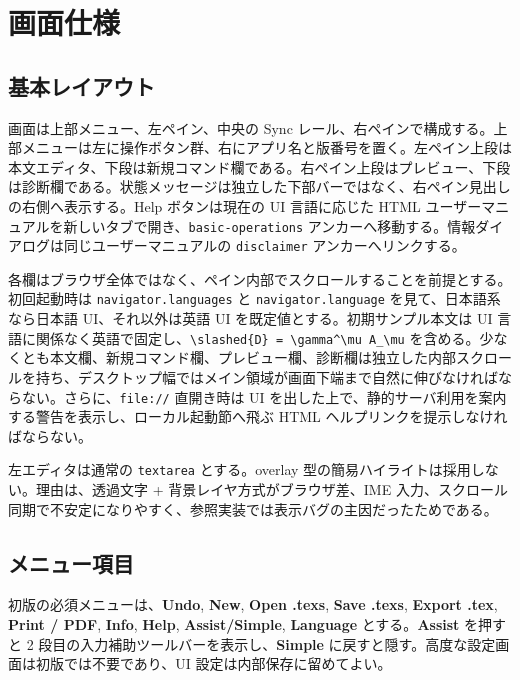 \documentclass[11pt,a4paper]{ltjsarticle}
\newcommand{\code}[1]{\texttt{#1}}
\newcommand{\term}[1]{\textsf{\textbf{#1}}}
\begin{document}
\section{画面仕様}

\subsection{基本レイアウト}

画面は上部メニュー、左ペイン、中央の Sync レール、右ペインで構成する。上部メニューは左に操作ボタン群、右にアプリ名と版番号を置く。左ペイン上段は本文エディタ、下段は新規コマンド欄である。右ペイン上段はプレビュー、下段は診断欄である。状態メッセージは独立した下部バーではなく、右ペイン見出しの右側へ表示する。Help ボタンは現在の UI 言語に応じた HTML ユーザーマニュアルを新しいタブで開き、\code{basic-operations} アンカーへ移動する。情報ダイアログは同じユーザーマニュアルの \code{disclaimer} アンカーへリンクする。

各欄はブラウザ全体ではなく、ペイン内部でスクロールすることを前提とする。初回起動時は \code{navigator.languages} と \code{navigator.language} を見て、日本語系なら日本語 UI、それ以外は英語 UI を既定値とする。初期サンプル本文は UI 言語に関係なく英語で固定し、\verb|\slashed{D} = \gamma^\mu A_\mu| を含める。少なくとも本文欄、新規コマンド欄、プレビュー欄、診断欄は独立した内部スクロールを持ち、デスクトップ幅ではメイン領域が画面下端まで自然に伸びなければならない。さらに、\code{file://} 直開き時は UI を出した上で、静的サーバ利用を案内する警告を表示し、ローカル起動節へ飛ぶ HTML ヘルプリンクを提示しなければならない。

\begin{decisionbox}[現行版のエディタ方針]
左エディタは通常の \code{textarea} とする。overlay 型の簡易ハイライトは採用しない。理由は、透過文字 + 背景レイヤ方式がブラウザ差、IME 入力、スクロール同期で不安定になりやすく、参照実装では表示バグの主因だったためである。
\end{decisionbox}

\subsection{メニュー項目}

初版の必須メニューは、\term{Undo}, \term{New}, \term{Open .texs}, \term{Save .texs}, \term{Export .tex}, \term{Print / PDF}, \term{Info}, \term{Help}, \term{Assist/Simple}, \term{Language} とする。\term{Assist} を押すと 2 段目の入力補助ツールバーを表示し、\term{Simple} に戻すと隠す。高度な設定画面は初版では不要であり、UI 設定は内部保存に留めてよい。
\end{document}
